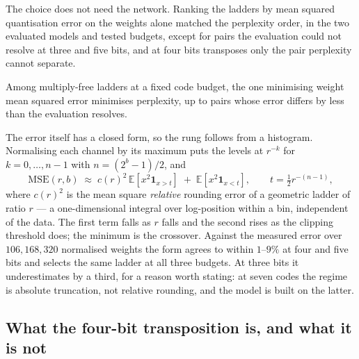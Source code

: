 The choice does not need the network. Ranking the ladders by mean squared
quantisation error on the weights alone matched the perplexity order, in the two
evaluated models and tested budgets, except for pairs the evaluation could not
resolve
at three and five bits, and at four bits transposes only the pair perplexity
cannot separate.

\begin{theorem}\label{thm:ladder}
Among multiply-free ladders at a fixed code budget, the one minimising weight
mean squared error minimises perplexity, up to pairs whose error differs by less
than the evaluation resolves.
\end{theorem}

The error itself has a closed form, so the rung follows from a histogram.
Normalising each channel by its maximum puts the levels at $r^{-k}$ for
$k=0,\dots,n-1$ with $n=(2^{b}-1)/2$, and
\[
  \mathrm{MSE}(r,b)\;\approx\;c(r)^{2}\,\mathbb{E}\!\left[x^{2}\mathbf{1}_{x>t}\right]
  \;+\;\mathbb{E}\!\left[x^{2}\mathbf{1}_{x<t}\right],\qquad t=\tfrac12 r^{-(n-1)},
\]
where $c(r)^2$ is the mean square \emph{relative} rounding error of a geometric
ladder of ratio $r$ --- a one-dimensional integral over log-position within a
bin, independent of the data. The first term falls as $r$ falls and the second
rises as the clipping threshold does; the minimum is the crossover. Against the
measured error over $106{,}168{,}320$ normalised weights the form agrees to
within $1$--$9\%$ at four and five bits and selects the same ladder at all three
budgets. At three bits it underestimates by a third, for a reason worth stating:
at seven codes the regime is absolute truncation, not relative rounding, and the
model is built on the latter.


\subsection{What the four-bit transposition is, and what it is not}

\label{sec:salience}

